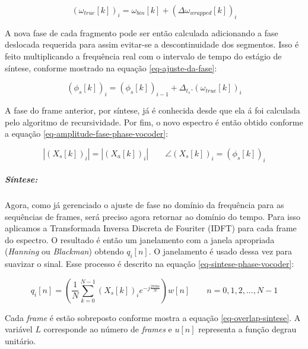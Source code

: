 					\begin{equation}
						\label{eq-true-frequency}
						(\omega_{true}[k])_i = \omega_{bin}[k] + (\Delta\omega_{wrapped}[k])_i
					\end{equation}
					
					A nova fase de cada fragmento pode ser então calculada adicionando a fase deslocada requerida para assim evitar-se a descontinuidade dos segmentos. Isso é feito multiplicando a frequência real com o intervalo de tempo do estágio de síntese, conforme mostrado na equação \ref{eq-ajuste-da-fase}:
					
					\begin{equation}
						\label{eq-ajuste-da-fase}
						(\phi_s[k])_i = (\phi_s[k])_{i-1} + \Delta_{t_s} . (\omega_{true}[k])_i
					\end{equation}
					
					A fase do frame anterior, por síntese, já é conhecida desde que ela á foi calculada pelo algoritmo de recursividade. Por fim, o novo espectro é então obtido conforme a equação \ref{eq-amplitude-fase-phase-vocoder}:
					
					\begin{equation}
						\label{eq-amplitude-fase-phase-vocoder}
						|(X_s[k])_i| = |(X_a[k])_i|
						\qquad
						\angle (X_s[k])_i = (\phi_s[k])_i
					\end{equation}
					
				\subparagraph{Síntese:}
					
					Agora, como já gerenciado o ajuste de fase no domínio da frequência para as sequências de frames, será preciso agora retornar ao domínio do tempo. Para isso aplicamos a Transformada Inversa Discreta de Fouriter (IDFT) para cada frame do espectro. O resultado é então um janelamento com a janela apropriada (\textit{Hanning} ou \textit{Blackman}) obtendo $ q_i[n] $. O janelamento é usado dessa vez para suavizar o sinal. Esse processo é descrito na equação \ref{eq-sintese-phase-vocoder}:
					
					\begin{equation}
						\label{eq-sintese-phase-vocoder}
						q_i[n] = \left(\frac{1}{N}\sum_{k=0}^{N-1}(X_s[k])_i e^{-j\frac{2\pi k n}{N}}\right)w[n]
						\qquad
						n = 0,1,2,...,N-1
					\end{equation}
					
					Cada \textit{frame} é estão sobreposto conforme mostra a equação \ref{eq-overlap-sintese}. A variável $ L $ corresponde ao número de \textit{frames} e $ u[n] $ representa a função degrau unitário.
					
